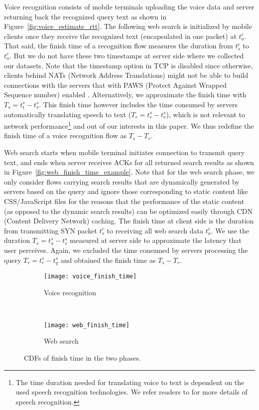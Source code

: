 Voice recognition consists of mobile terminals uploading the voice data and server returning back the recognized query text as shown in Figure~\ref{fig:voice_estimate_rtt}. The following web search is initialized by mobile clients once they receive the recognized text (encapsulated in one packet) at $t^c_a$. That said, the finish time of a recognition flow measures the duration from $t^c_s$ to $t^c_a$. But we do not have these two timestamps at server side where we collected our datasets. Note that the timestamp option in TCP is  disabled since otherwise, clients behind NATs (Network Address Translations) might not be able to build connections with the servers that with PAWS (Protect Against Wrapped Sequence number) \cite{rfc7323} enabled \cite{Wang:2011:USM:2018436.2018479}. Alternatively, we approximate the finish time with $T_s=t^s_t - t^s_s$. This finish time however includes the time consumed by servers automatically translating speech to text ($T_r=t^s_r - t^s_v$), which is not relevant to network performance\footnote{The time duration needed for translating voice to text is dependent on the used speech recognition technologies. We refer readers to \cite{36463,schalkwyk2010your} for more details of speech recognition.} and out of our interests in this paper. We thus redefine the finish time of a voice recognition flow as $T_s-T_r$.


Web search starts when mobile terminal initiates connection to transmit query text, and ends when server receives ACKs for all returned search results as shown in Figure~\ref{fig:web_finish_time_example}. Note that for the web search phase, we only consider flows carrying search results that are dynamically generated by servers based on the query and ignore those corresponding to static content like CSS/JavaScript files for the reasons that the performance of the static content (as opposed to the dynamic search results) can be optimized easily through CDN (Content Delivery Network) caching. The finish time at client side is the duration from transmitting SYN packet $t^c_s$ to receiving all web search data $t^c_a$. We use the duration $T_s=t^s_a - t^s_s$ measured at server side to approximate the latency that user perceives. Again, we excluded the time consumed by servers processing the query $T_r=t^s_r - t^s_q$ and obtained the finish time as $T_s-T_r$.


\begin{figure}[ht]
\centering
\begin{subfigure}[b]{0.8\linewidth}
	\texttt{[image: voice\_finish\_time]}
\caption{Voice recognition}
\label{fig:voice_finish_time}
\end{subfigure} \\
\begin{subfigure}[b]{0.8\linewidth}
	\texttt{[image: web\_finish\_time]}
\caption{Web search}
\label{fig:web_finish_time}
\end{subfigure}
\caption{CDFs of finish time in the two phases.}
\label{fig:finish_time}
\end{figure}


